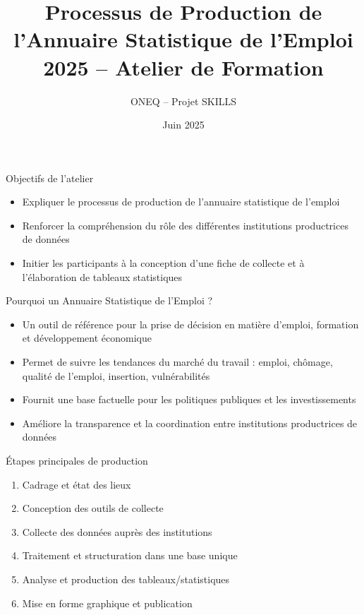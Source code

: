 \documentclass{beamer}
\title[Annuaire Statistique de l'Emploi]{Processus de Production de l’Annuaire Statistique de l’Emploi 2025 – Atelier de Formation}
\author{ONEQ -- Projet SKILLS}
\date{Juin 2025}
\begin{document}
\begin{frame}
  \titlepage
\end{frame}

\begin{frame}{Objectifs de l'atelier}
\begin{itemize}
  \item Expliquer le processus de production de l’annuaire statistique de l’emploi
  \item Renforcer la compréhension du rôle des différentes institutions productrices de données
  \item Initier les participants à la conception d’une fiche de collecte et à l’élaboration de tableaux statistiques
\end{itemize}
\end{frame}

\begin{frame}{Pourquoi un Annuaire Statistique de l’Emploi ?}
\begin{itemize}
  \item Un outil de référence pour la prise de décision en matière d’emploi, formation et développement économique
  \item Permet de suivre les tendances du marché du travail : emploi, chômage, qualité de l’emploi, insertion, vulnérabilités
  \item Fournit une base factuelle pour les politiques publiques et les investissements
  \item Améliore la transparence et la coordination entre institutions productrices de données
\end{itemize}
\end{frame}

\begin{frame}{Étapes principales de production}
\begin{enumerate}
  \item Cadrage et état des lieux
  \item Conception des outils de collecte
  \item Collecte des données auprès des institutions
  \item Traitement et structuration dans une base unique
  \item Analyse et production des tableaux/statistiques
  \item Mise en forme graphique et publication
\end{enumerate}
\end{frame}
\end{document}
